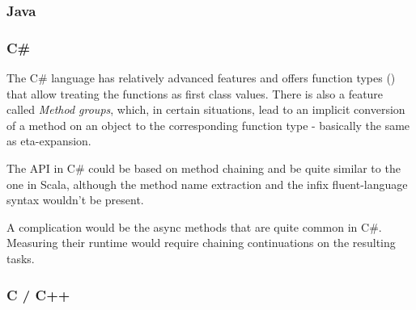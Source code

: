 \subsubsection{Java}

\subsubsection{C\#}

The C\# language has relatively advanced features and offers function types () that allow treating the functions as first class values. There is also a feature called \textit{Method groups}, which, in certain situations, lead to an implicit conversion of a method on an object to the corresponding function type - basically the same as eta-expansion.


The API in C\# could be based on method chaining and be quite similar to the one in Scala, although the method name extraction and the infix fluent-language syntax wouldn't be present.

A complication would be the async methods that are quite common in C\#. Measuring their runtime would require chaining continuations on the resulting tasks.

\subsubsection{C / C++}